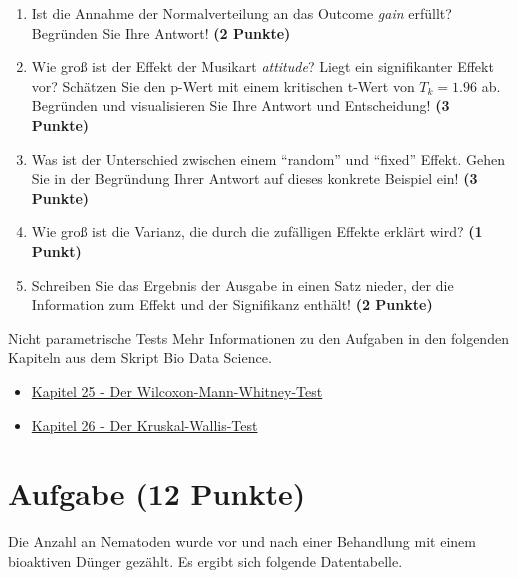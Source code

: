 \documentclass[a4paper, 10pt]{scrartcl}\usepackage[]{graphicx}\usepackage[]{xcolor}
\begin{document}
\begin{enumerate}
\item Ist die Annahme der Normalverteilung an das Outcome \textit{gain} erf{\"u}llt?
  Begr{\"u}nden Sie Ihre Antwort! \textbf{(2 Punkte)}
\item Wie gro{\ss} ist der Effekt der Musikart \textit{attitude}? Liegt ein signifikanter
  Effekt vor? Sch{\"a}tzen Sie den p-Wert mit einem kritischen t-Wert von $T_k
  = 1.96$ ab. Begr{\"u}nden und visualisieren Sie Ihre Antwort und
  Entscheidung! \textbf{(3 Punkte)}
\item Was ist der Unterschied zwischen einem "`random"' und "`fixed"'
  Effekt. Gehen Sie in der Begr{\"u}ndung Ihrer Antwort auf dieses konkrete
  Beispiel ein! \textbf{(3 Punkte)}
\item Wie gro{\ss} ist die Varianz, die durch die zuf{\"a}lligen Effekte erkl{\"a}rt wird? \textbf{(1 Punkt)}
\item Schreiben Sie das Ergebnis der \Rlogo Ausgabe in einen Satz nieder, der die
  Information zum Effekt und der Signifikanz enth{\"a}lt! \textbf{(2 Punkte)}
\end{enumerate}
 
\clearpage
\begin{graybox}{Nicht parametrische Tests}
Mehr Informationen zu den Aufgaben in den folgenden Kapiteln aus dem Skript Bio Data Science.
  \begin{itemize}
  \item \href{https://jkruppa.github.io/stat-tests-utest.html}{Kapitel 25 - Der Wilcoxon-Mann-Whitney-Test}
  \item \href{https://jkruppa.github.io/stat-tests-kruskal.html}{Kapitel 26 - Der Kruskal-Wallis-Test}
  \end{itemize}
\end{graybox}

\section{Aufgabe \hfill (12 Punkte)}

Die Anzahl an Nematoden wurde vor und nach einer Behandlung mit einem
bioaktiven D{\"u}nger gez{\"a}hlt. Es ergibt sich folgende Datentabelle.
\end{document}
